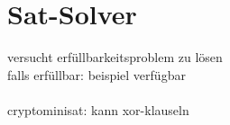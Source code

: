 \section{Sat-Solver}
\label{sec:satsolver}


versucht erfüllbarkeitsproblem zu lösen\\
falls erfüllbar: beispiel verfügbar\\
~\\
cryptominisat: kann xor-klauseln